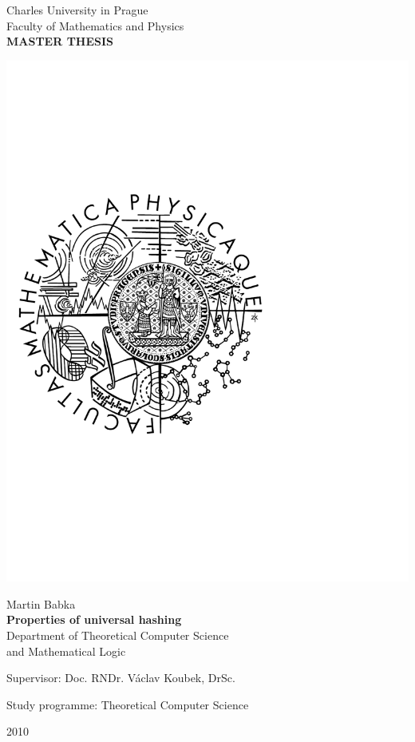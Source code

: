 \begin{titlepage}
\begin{center}

\large
Charles University in Prague\\
Faculty of Mathematics and Physics\\

\vspace{5mm}
{\Large\bf MASTER THESIS}

\vspace{55mm}
\includegraphics[scale=0.45,viewport=0 0 371 365]{images/logo}

\vspace{11mm}
{\Large Martin Babka}\\
\vspace{5mm}
{\Large\bf Properties of universal hashing}\\
\vspace{5mm}
Department of Theoretical Computer Science\\ and Mathematical Logic\\
\end{center}
\vspace{15mm}

\large\centering\noindent Supervisor: Doc. RNDr. Václav Koubek, DrSc.\\
\vspace{5mm} 

\centering\noindent Study programme: Theoretical Computer Science
\vspace{\fill}

\begin{center}
2010
\end{center}

\end{titlepage}